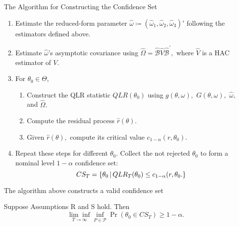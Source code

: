\documentclass[smaller, aspectratio=169]{beamer}
\begin{document}
\begin{frame}[c]{The Algorithm for Constructing the Confidence Set}
  \begin{enumerate}
    \item Estimate the reduced-form parameter $\widehat{\omega} \coloneqq \left(\widehat{\omega}_{1}, \widehat{\omega}_{2}, \widehat{\omega}_{3}\right)'$ following the estimators defined above.
      \medskip
%
    \item Estimate $\widehat{\omega}$'s asymptotic covariance using $\widehat{\Omega} = \widehat{\mathcal{B}}\widehat{V}\widehat{\mathcal{B}}^{\prime}, $ where $\widehat{V}$ is a HAC estimator of $V$.
      \medskip
  
    \item For $\theta_{0}\in \Theta$, 
%
    \begin{enumerate}
      \item Construct the QLR statistic $QLR(\theta_{0})$ using $g(\theta, \omega), $ $G(\theta, \omega), $ $\widehat{\omega}, $ and $\widehat{\Omega}.$
%
      \item Compute the residual process $\widehat{r}(\theta)$.
  
      \item Given $\widehat{r}(\theta), $ compute its critical value $c_{1-\alpha}(r, \theta_{0})$.
%
    \end{enumerate}
      \medskip
%
  \item Repeat these steps for different $\theta_{0}$. Collect the not rejected $\theta_{0}$ to form a nominal level $1-\alpha $ confidence set: 
%
    \begin{equation}
      CS_{T} = \left\lbrace \theta_{0} \,\middle\vert\, QLR_{T}(\theta_{0})\leq c_{1-\alpha}(r, \theta_{0}. \right\rbrace
    \end{equation}
  \end{enumerate}
\end{frame}


\begin{frame}[c]{The algorithm above constructs a valid confidence set}

\begin{theorem}
  \label{Lemma CS}
  Suppose Assumptions R and S hold. Then 
%
  \begin{equation*} 
    \underset{T\rightarrow \infty}{\lim \inf}\underset{P\in \mathcal{P}}{\inf}\Pr \left( \theta _{0}\in CS_{T}\right) \geq 1-\alpha .
  \end{equation*}
\end{theorem}

\end{frame}
\end{document}
